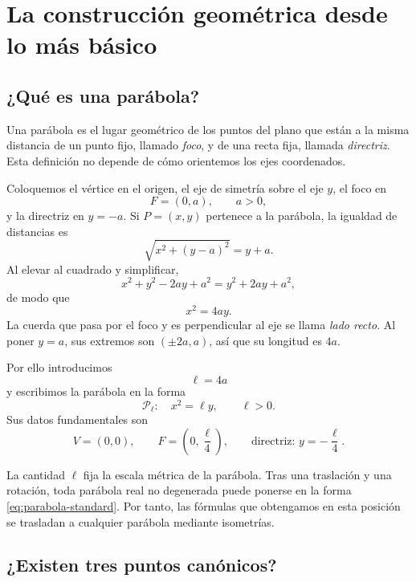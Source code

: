 \documentclass[11pt,a4paper,openany]{report}
\begin{document}
\clearpage
{}

\chapter{La construcción geométrica desde lo más básico}

\section{¿Qué es una parábola?}

Una parábola es el lugar geométrico de los puntos del plano que están a la misma distancia de un punto fijo, llamado \emph{foco}, y de una recta fija, llamada \emph{directriz}. Esta definición no depende de cómo orientemos los ejes coordenados.

Coloquemos el vértice en el origen, el eje de simetría sobre el eje \(y\), el foco en
\[
 F=(0,a),\qquad a>0,
\]
y la directriz en \(y=-a\). Si \(P=(x,y)\) pertenece a la parábola, la igualdad de distancias es
\[
 \sqrt{x^2+(y-a)^2}=y+a.
\]
Al elevar al cuadrado y simplificar,
\[
 x^2+y^2-2ay+a^2=y^2+2ay+a^2,
\]
de modo que
\[
 x^2=4ay.
\]
La cuerda que pasa por el foco y es perpendicular al eje se llama \emph{lado recto}. Al poner \(y=a\), sus extremos son \((\pm2a,a)\), así que su longitud es \(4a\).

Por ello introducimos
\[
 \ell=4a
\]
y escribimos la parábola en la forma
\begin{equation}
 \boxed{\mathcal P_\ell:\quad x^2=\ell y},\qquad \ell>0.
 \label{eq:parabola-standard}
\end{equation}
Sus datos fundamentales son
\[
 V=(0,0),\qquad F=\left(0,\frac\ell4\right),\qquad
 \text{directriz: }y=-\frac\ell4.
\]

\begin{insightbox}
La cantidad \(\ell\) fija la escala métrica de la parábola. Tras una traslación y una rotación, toda parábola real no degenerada puede ponerse en la forma \eqref{eq:parabola-standard}. Por tanto, las fórmulas que obtengamos en esta posición se trasladan a cualquier parábola mediante isometrías.
\end{insightbox}

\section{¿Existen tres puntos canónicos?}
\end{document}
